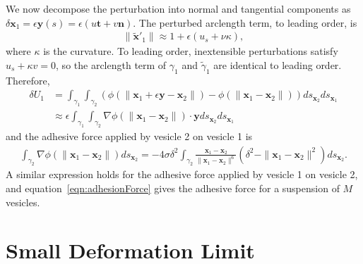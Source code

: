 \documentclass[aps,prl,twocolumn,showpacs,amsmath,amssymb]{revtex4-1}
\newcommand{\nn}{\mathbf{n}}
\renewcommand{\tt}{\mathbf{t}}
\newcommand{\xx}{\mathbf{x}}
\newcommand{\yy}{\mathbf{y}}
\begin{document}
\begin{appendices}
We now decompose the perturbation into normal and tangential components
as $\delta \xx_1 = \epsilon \yy(s) = \epsilon(u\tt + v\nn)$. The
perturbed arclength term, to leading order, is
\begin{align*}
  \|\tilde{\xx}'_1\| \approx 1 + \epsilon(u_s + \nu\kappa),
\end{align*}
where $\kappa$ is the curvature.  To leading order, inextensible
perturbations satisfy $u_s + \kappa v = 0$, so the arclength term of
$\gamma_1$ and $\tilde{\gamma}_1$ are identical to leading order.
Therefore,
\begin{align*}
  \delta U_1 &= \int_{\gamma_1} \int_{\gamma_2} \left(
  \phi(\|\xx_1 + \epsilon \yy  - \xx_2\|) - \phi(\|\xx_1 - \xx_2\|)
  \right) ds_{\xx_2} ds_{\xx_1} \\
  &\approx \epsilon \int_{\gamma_1} \int_{\gamma_2}
  \nabla \phi (\|\xx_1 - \xx_2\|) \cdot \yy ds_{\xx_2} ds_{\xx_1}
\end{align*}
and the adhesive force applied by vesicle 2 on vesicle 1 is
\begin{align*}
  \int_{\gamma_2}\nabla \phi(\|\xx_1 - \xx_2\|)ds_{\xx_2} = 
  -4 \sigma \delta^2 \int_{\gamma_2}
  \frac{\xx_1 - \xx_2}{\|\xx_1 - \xx_2\|^6} 
  \left(\delta^2 - \|\xx_1 - \xx_2\|^2 \right) ds_{\xx_2}.
\end{align*}
A similar expression holds for the adhesive force applied by vesicle 1
on vesicle 2, and equation~\eqref{eqn:adhesionForce} gives the adhesive
force for a suspension of $M$ vesicles.

\section{Small Deformation Limit}
\label{sec:appendixB}




\end{appendices}
\end{document}
